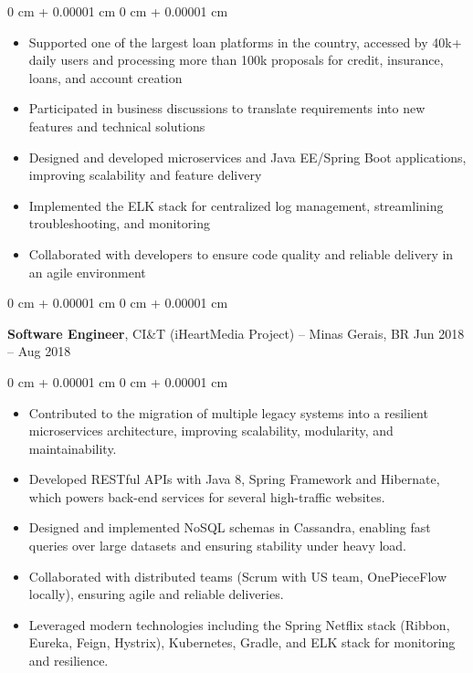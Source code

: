 \documentclass[10pt, letterpaper]{article}
\newenvironment{highlights}{
    \begin{itemize}[
        topsep=0.10 cm,
        parsep=0.10 cm,
        partopsep=0pt,
        itemsep=0pt,
        leftmargin=0 cm + 10pt
    ]
}{
    \end{itemize}
} %
\newenvironment{onecolentry}{
    \begin{adjustwidth}{
        0 cm + 0.00001 cm
    }{
        0 cm + 0.00001 cm
    }
}{
    \end{adjustwidth}
} %
\newenvironment{twocolentry}[2][]{
    \onecolentry
    \def\secondColumn{#2}
    \setcolumnwidth{\fill, 4.5 cm}
    \begin{paracol}{2}
}{
    \switchcolumn \raggedleft \secondColumn
    \end{paracol}
    \endonecolentry
} %
\begin{document}
        \begin{onecolentry}
            \begin{highlights}
                \item Supported one of the largest loan platforms in the country, accessed by 40k+ daily users and processing more than 100k proposals for credit, insurance, loans, and account creation
                \item Participated in business discussions to translate requirements into new features and technical solutions
                \item Designed and developed microservices and Java EE/Spring Boot applications, improving scalability and feature delivery
                \item Implemented the ELK stack for centralized log management, streamlining troubleshooting, and monitoring
                \item Collaborated with developers to ensure code quality and reliable delivery in an agile environment
            \end{highlights}
        \end{onecolentry}
        
        \vspace{0.2 cm}
        
        
        \begin{twocolentry}{
            Jun 2018 – Aug 2018
        }
            \textbf{Software Engineer}, CI\&T (iHeartMedia Project) -- Minas Gerais, BR\end{twocolentry}

        \vspace{0.10 cm}
        
        \begin{onecolentry}
            \begin{highlights}
                \item Contributed to the migration of multiple legacy systems into a resilient microservices architecture, improving scalability, modularity, and maintainability.
                \item Developed RESTful APIs with Java 8, Spring Framework and Hibernate, which powers back-end services for several high-traffic websites.
                \item Designed and implemented NoSQL schemas in Cassandra, enabling fast queries over large datasets and ensuring stability under heavy load.
                \item Collaborated with distributed teams (Scrum with US team, OnePieceFlow locally), ensuring agile and reliable deliveries.
                \item Leveraged modern technologies including the Spring Netflix stack (Ribbon, Eureka, Feign, Hystrix), Kubernetes, Gradle, and ELK stack for monitoring and resilience.
            \end{highlights}
        \end{onecolentry}
        
\end{document}
